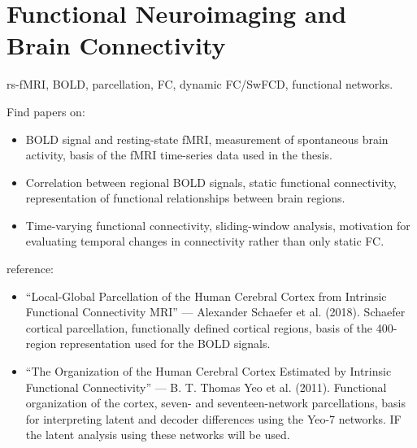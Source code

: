 \section{Functional Neuroimaging and Brain Connectivity}
rs-fMRI, BOLD, parcellation, FC, dynamic FC/SwFCD, functional networks.

Find papers on:
\begin{itemize}
    \item BOLD signal and resting-state fMRI, measurement of spontaneous brain activity, basis of the fMRI time-series data used in the thesis.
    \item Correlation between regional BOLD signals, static functional connectivity, representation of functional relationships between brain regions.
    \item Time-varying functional connectivity, sliding-window analysis, motivation for evaluating temporal changes in connectivity rather than only static FC.
\end{itemize}

reference:
\begin{itemize}
    \item “Local-Global Parcellation of the Human Cerebral Cortex from Intrinsic Functional Connectivity MRI” — Alexander Schaefer et al. (2018). Schaefer cortical parcellation, functionally defined cortical regions, basis of the 400-region representation used for the BOLD signals.
    \item “The Organization of the Human Cerebral Cortex Estimated by Intrinsic Functional Connectivity” — B. T. Thomas Yeo et al. (2011). Functional organization of the cortex, seven- and seventeen-network parcellations, basis for interpreting latent and decoder differences using the Yeo-7 networks. IF the latent analysis using these networks will be used.
\end{itemize}
